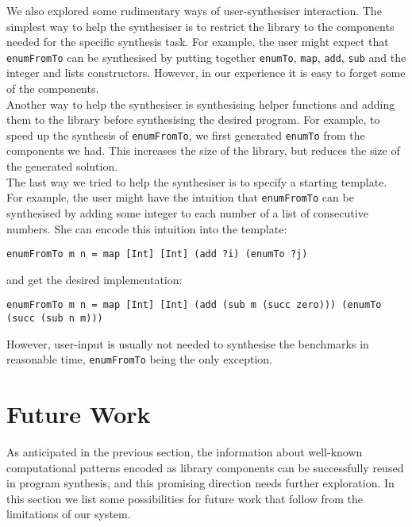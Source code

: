 We also explored some rudimentary ways of user-synthesiser interaction. The simplest way to help the synthesiser is to restrict the library to the components needed for the specific synthesis task. For example, the user might expect that \lstinline!enumFromTo! can be synthesised by putting together \lstinline!enumTo!, \lstinline!map!, \lstinline!add!, \lstinline!sub! and the integer and lists constructors. However, in our experience it is easy to forget some of the components.\\
Another way to help the synthesiser is synthesising helper functions and adding them to the library before synthesising the desired program. For example, to speed up the synthesis of \lstinline!enumFromTo!, we first generated \lstinline!enumTo! from the components we had. This increases the size of the library, but reduces the size of the generated solution.\\
The last way we tried to help the synthesiser is to specify a starting template. For example, the user might have the intuition that \lstinline!enumFromTo! can be synthesised by adding some integer to each number of a list of consecutive numbers. She can encode this intuition into the template:
\begin{lstlisting}[style=plain]
enumFromTo m n = map [Int] [Int] (add ?i) (enumTo ?j)
\end{lstlisting}
and get the desired implementation:
\begin{lstlisting}[style=plain]
enumFromTo m n = map [Int] [Int] (add (sub m (succ zero))) (enumTo (succ (sub n m)))
\end{lstlisting}
However, user-input is usually not needed to synthesise the benchmarks in reasonable time, \lstinline!enumFromTo! being the only exception.


  
\section{Future Work}

As anticipated in the previous section, the information about well-known computational patterns encoded as library components can be successfully reused in program synthesis, and this promising direction needs further exploration. In this section we list some possibilities for future work that follow from the limitations of our system.

